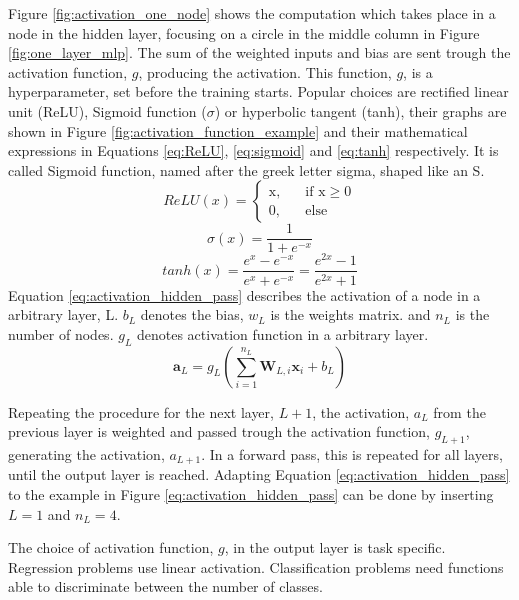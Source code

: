 Figure \ref{fig:activation_one_node} shows the computation which takes place in a node in the hidden layer, focusing on a circle in the middle column in Figure \ref{fig:one_layer_mlp}. The sum of the weighted inputs and bias are sent trough the activation function, $g$, producing the activation. This function, $g$, is a hyperparameter, set before the training starts. Popular choices are rectified linear unit (ReLU), Sigmoid function  ($\sigma$) or hyperbolic tangent (tanh), their graphs are shown in Figure \ref{fig:activation_function_example} and their mathematical expressions in Equations \eqref{eq:ReLU}, \eqref{eq:sigmoid} and \eqref{eq:tanh} respectively. It is called Sigmoid function, named after the greek letter sigma, shaped like an S. 
\begin{equation} \label{eq:ReLU}
   ReLU\left(x\right) = 
     \begin{cases}
       \text{x,} &\quad\text{if x} \ge 0\\
       \text{0,} &\quad\text{else}
     \end{cases}
\end{equation}
\begin{equation} \label{eq:sigmoid}
   \sigma \left( x \right) = \frac{1}{1 + e^{-x}}
\end{equation}
\begin{equation} \label{eq:tanh}
   tanh\left( x \right) = \frac{e^x - e^{-x}}{e^x + e^{-x}} = \frac{e^{2x} - 1}{e^{2x} + 1}
\end{equation}
Equation \eqref{eq:activation_hidden_pass} describes the activation of a node in a arbitrary layer, L. $b_L$ denotes the bias, $w_L$ is the weights matrix. and $n_L$ is the number of  nodes. $g_L$ denotes activation function in a arbitrary layer.
\begin{equation} \label{eq:activation_hidden_pass}
    \textbf{a}_L = g_L\left(\sum_{i=1}^{n_L} \textbf{W}_{L, i} \textbf{x}_i + b_L\right)
\end{equation}

Repeating the procedure for the next layer, $L+1$, the activation, $a_L$ from the previous layer is weighted and passed trough the activation function, $g_{L+1}$, generating the activation, $a_{L+1}$. In a forward pass, this is repeated for all layers, until the output layer is reached. Adapting Equation \eqref{eq:activation_hidden_pass} to the example in Figure \ref{eq:activation_hidden_pass} can be done by inserting $L=1$ and $n_L=4$.

The choice of activation function, $g$, in the output layer is task specific. Regression problems use linear activation. Classification problems need functions able to discriminate between the number of classes.

